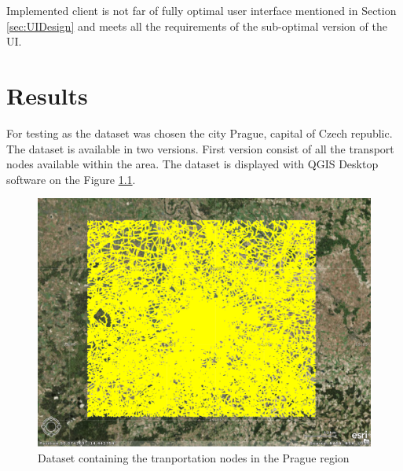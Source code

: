\documentclass[thesis=M,english]{FITthesis}[2012/10/20]
\begin{document}
Implemented client is not far of fully optimal user interface mentioned in Section \ref{sec:UIDesign} and meets all the requirements of the sub-optimal version of the UI. 


\chapter{Results}
\label{ch:Results}

For testing as the dataset was chosen the city Prague, capital of Czech republic. The dataset is available in two versions. First version consist of all the transport nodes available within the area. 
The dataset is displayed with QGIS Desktop software on the Figure \ref{pic:dataset1}.
\begin{figure}[H]
\centering
\includegraphics[width=1\textwidth]{pics/praguedatasetL}
\caption{Dataset containing the tranportation nodes in the Prague region}
\label{pic:dataset1}
\end{figure}
\end{document}

